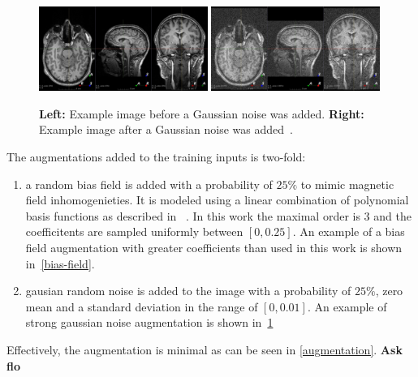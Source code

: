    \begin{figure}[h]
   \begin{center}
      \includegraphics[keepaspectratio, width=0.49\textwidth]{img/random_noise-0.png}
      \includegraphics[keepaspectratio, width=0.49\textwidth]{img/random_noise-1.png}
   \end{center}
   \caption{
      \textbf{Left:} Example image before a Gaussian noise was added.
      \textbf{Right:} Example image after a Gaussian noise was added~\autocite{noauthor_augmentation_nodate}.
   }
   \label{random-noise}
\end{figure}


The augmentations added to the training inputs is two-fold:
\begin{enumerate}
 \item a random bias field is added with a probability of $25\%$ to mimic magnetic field inhomogenieties.
      It is modeled using a linear combination of polynomial basis functions as described in ~\autocite{van_leemput_automated_1999}.
      In this work the maximal order is $3$ and the coefficitents are sampled uniformly between $[0, 0.25]$.
      An example of a bias field augmentation with greater coefficients than used in this work is shown in~\ref{bias-field}.

 \item gausian random noise is added to the image with a probability of $25\%$, zero mean and a standard deviation in the range of $[0, 0.01]$.
      An example of strong gaussian noise augmentation is shown in~\ref{random-noise}
\end{enumerate}
Effectively, the augmentation is minimal as can be seen in \ref{augmentation}. \textbf{Ask flo}


